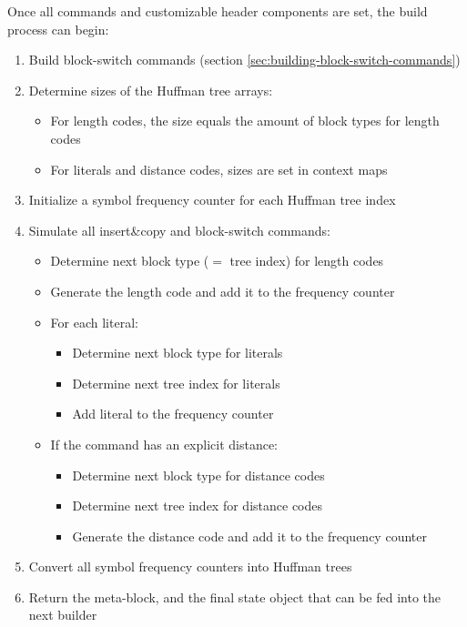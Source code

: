 \documentclass[english,master,dept460,male,cpp,cpdeclaration]{diploma}
\newcommand{\nosep}{\itemsep0em}
\begin{document}
		Once all commands and customizable header components are set, the build process can begin:
		
		\begin{enumerate} \nosep
			\item Build block-switch commands (section \ref{sec:building-block-switch-commands})
			\item Determine sizes of the Huffman tree arrays:
				\begin{itemize} \nosep
					\item For length codes, the size equals the amount of block types for length codes
					\item For literals and distance codes, sizes are set in context maps
				\end{itemize}
			\item Initialize a symbol frequency counter for each Huffman tree index
			\item Simulate all insert\&copy and block-switch commands:
				\begin{itemize} \nosep
					\item Determine next block type ($=$ tree index) for length codes
					\item Generate the length code and add it to the frequency counter
					\item For each literal:
						\begin{itemize} \nosep
							\item Determine next block type for literals
							\item Determine next tree index for literals
							\item Add literal to the frequency counter
						\end{itemize}
					\item If the command has an explicit distance:
						\begin{itemize} \nosep
							\item Determine next block type for distance codes
							\item Determine next tree index for distance codes
							\item Generate the distance code and add it to the frequency counter
						\end{itemize}
				\end{itemize}
			\item Convert all symbol frequency counters into Huffman trees
			\item Return the meta-block, and the final state object that can be fed into the next builder
		\end{enumerate}
		
\end{document}
